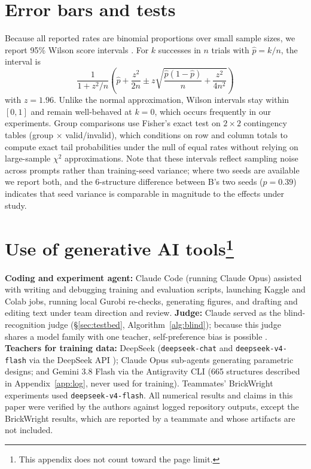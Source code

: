 \documentclass{article}
\begin{document}
\section{Error bars and tests}
\label{app:stats}
Because all reported rates are binomial proportions over small sample sizes, we report 95\% Wilson score intervals \cite{wilson1927}. For $k$ successes in $n$ trials with $\hat p=k/n$, the interval is
\begin{equation*}
\frac{1}{1+z^2/n}\left(\hat p+\frac{z^2}{2n}\pm z\sqrt{\frac{\hat p(1-\hat p)}{n}+\frac{z^2}{4n^2}}\right)
\end{equation*}
with $z=1.96$. Unlike the normal approximation, Wilson intervals stay within $[0,1]$ and remain well-behaved at $k=0$, which occurs frequently in our experiments. Group comparisons use Fisher's exact test on $2\times2$ contingency tables (group $\times$ valid/invalid), which conditions on row and column totals to compute exact tail probabilities under the null of equal rates without relying on large-sample $\chi^2$ approximations. Note that these intervals reflect sampling noise across prompts rather than training-seed variance; where two seeds are available we report both, and the 6-structure difference between B's two seeds ($p=0.39$) indicates that seed variance is comparable in magnitude to the effects under study.

\section[Use of generative AI tools]{Use of generative AI tools\protect\footnote{This appendix does not count toward the page limit.}}
\label{app:ai}
\textbf{Coding and experiment agent:} Claude Code \cite{claudecode} (running Claude Opus) assisted with writing and debugging training and evaluation scripts, launching Kaggle and Colab jobs, running local Gurobi re-checks, generating figures, and drafting and editing text under team direction and review. \textbf{Judge:} Claude served as the blind-recognition judge (\S\ref{sec:testbed}, Algorithm~\ref{alg:blind}); because this judge shares a model family with one teacher, self-preference bias is possible \cite{panickssery2024selfpref}. \textbf{Teachers for training data:} DeepSeek (\texttt{deepseek-chat} and \texttt{deepseek-v4-flash} via the DeepSeek API \cite{deepseekapi}); Claude Opus sub-agents generating parametric designs; and Gemini 3.8 Flash via the Antigravity CLI \cite{antigravity} (665 structures described in Appendix~\ref{app:log}, never used for training). Teammates' BrickWright experiments used \texttt{deepseek-v4-flash}. All numerical results and claims in this paper were verified by the authors against logged repository outputs, except the BrickWright results, which are reported by a teammate and whose artifacts are not included.
\end{document}
